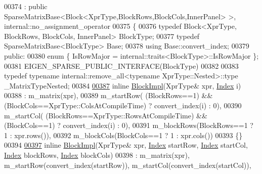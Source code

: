 \begin{DoxyCode}
00374   : \textcolor{keyword}{public} SparseMatrixBase<Block<XprType,BlockRows,BlockCols,InnerPanel> >, 
      internal::no\_assignment\_operator
00375 \{
00376     \textcolor{keyword}{typedef} Block<XprType, BlockRows, BlockCols, InnerPanel> BlockType;
00377     \textcolor{keyword}{typedef} SparseMatrixBase<BlockType> Base;
00378     \textcolor{keyword}{using} Base::convert\_index;
00379 \textcolor{keyword}{public}:
00380     \textcolor{keyword}{enum} \{ IsRowMajor = internal::traits<BlockType>::IsRowMajor \};
00381     EIGEN\_SPARSE\_PUBLIC\_INTERFACE(BlockType)
00382 
00383     \textcolor{keyword}{typedef} \textcolor{keyword}{typename} internal::remove\_all<typename XprType::Nested>::type \_MatrixTypeNested;
00384 
\hyperlink{class_eigen_1_1_block_impl_3_01_xpr_type_00_01_block_rows_00_01_block_cols_00_01_inner_panel_00_01_sparse_01_4_aa724feeda73e4d5d2330c6dced2d18f9}{00387}     \textcolor{keyword}{inline} \hyperlink{class_eigen_1_1_block_impl_3_01_xpr_type_00_01_block_rows_00_01_block_cols_00_01_inner_panel_00_01_sparse_01_4_aa724feeda73e4d5d2330c6dced2d18f9}{BlockImpl}(XprType& xpr, \hyperlink{group___core___module_a554f30542cc2316add4b1ea0a492ff02}{Index} i)
00388       : m\_matrix(xpr),
00389         m\_startRow( (BlockRows==1) && (BlockCols==XprType::ColsAtCompileTime) ? convert\_index(i) : 0),
00390         m\_startCol( (BlockRows==XprType::RowsAtCompileTime) && (BlockCols==1) ? convert\_index(i) : 0),
00391         m\_blockRows(BlockRows==1 ? 1 : xpr.rows()),
00392         m\_blockCols(BlockCols==1 ? 1 : xpr.cols())
00393     \{\}
00394 
\hyperlink{class_eigen_1_1_block_impl_3_01_xpr_type_00_01_block_rows_00_01_block_cols_00_01_inner_panel_00_01_sparse_01_4_a2fe461bd49f27e586b7d0e652e370644}{00397}     \textcolor{keyword}{inline} \hyperlink{class_eigen_1_1_block_impl_3_01_xpr_type_00_01_block_rows_00_01_block_cols_00_01_inner_panel_00_01_sparse_01_4_a2fe461bd49f27e586b7d0e652e370644}{BlockImpl}(XprType& xpr, \hyperlink{group___core___module_a554f30542cc2316add4b1ea0a492ff02}{Index} startRow, \hyperlink{group___core___module_a554f30542cc2316add4b1ea0a492ff02}{Index} startCol, 
      \hyperlink{group___core___module_a554f30542cc2316add4b1ea0a492ff02}{Index} blockRows, \hyperlink{group___core___module_a554f30542cc2316add4b1ea0a492ff02}{Index} blockCols)
00398       : m\_matrix(xpr), m\_startRow(convert\_index(startRow)), m\_startCol(convert\_index(startCol)), 

\end{DoxyCode}
